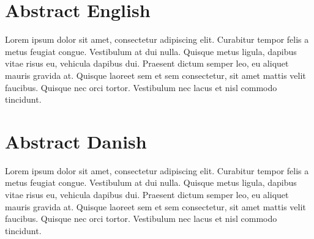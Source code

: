 \section*{Abstract English}
Lorem ipsum dolor sit amet, consectetur adipiscing elit. Curabitur tempor felis a metus feugiat congue. Vestibulum at dui nulla. Quisque metus ligula, dapibus vitae risus eu, vehicula dapibus dui. Praesent dictum semper leo, eu aliquet mauris gravida at. Quisque laoreet sem et sem consectetur, sit amet mattis velit faucibus. Quisque nec orci tortor. Vestibulum nec lacus et nisl commodo tincidunt.
\section*{Abstract Danish}
Lorem ipsum dolor sit amet, consectetur adipiscing elit. Curabitur tempor felis a metus feugiat congue. Vestibulum at dui nulla. Quisque metus ligula, dapibus vitae risus eu, vehicula dapibus dui. Praesent dictum semper leo, eu aliquet mauris gravida at. Quisque laoreet sem et sem consectetur, sit amet mattis velit faucibus. Quisque nec orci tortor. Vestibulum nec lacus et nisl commodo tincidunt.